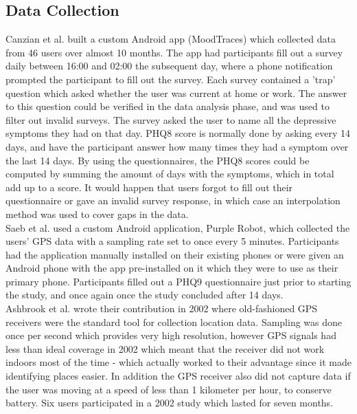 \subsection{Data Collection}
Canzian et al. built a custom Android app (MoodTraces) which collected data from 46 users over almost 10 months. The app had participants fill out a survey daily between 16:00 and 02:00 the subsequent day, where a phone notification prompted the participant to fill out the survey. Each survey contained a 'trap' question which asked whether the user was current at home or work. The answer to this question could be verified in the data analysis phase, and was used to filter out invalid surveys. The survey asked the user to name all the depressive symptoms they had on that day. PHQ8 score is normally done by asking every 14 days, and have the participant answer how many times they had a symptom over the last 14 days. By using the questionnaires, the PHQ8 scores could be computed by summing the amount of days with the symptoms, which in total add up to a score. It would happen that users forgot to fill out their questionnaire or gave an invalid survey response, in which case an interpolation method was used to cover gaps in the data.\\

Saeb et al. used a custom Android application, Purple Robot, which collected the users' GPS data with a sampling rate set to once every 5 minutes. Participants had the application manually installed on their existing phones or were given an Android phone with the app pre-installed on it which they were to use as their primary phone. Participants filled out a PHQ9 questionnaire just prior to starting the study, and once again once the study concluded after 14 days.\\

Ashbrook et al. wrote their contribution in 2002 where old-fashioned GPS receivers were the standard tool for collection location data. Sampling was done once per second which provides very high resolution, however GPS signals had less than ideal coverage in 2002 which meant that the receiver did not work indoors most of the time - which actually worked to their advantage since it made identifying places easier. In addition the GPS receiver also did not capture data if the user was moving at a speed of less than 1 kilometer per hour, to conserve battery. Six users participated in a 2002 study which lasted for seven months.\\

